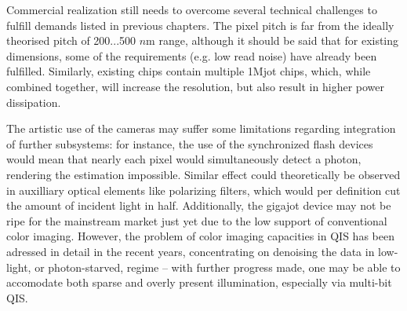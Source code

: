 
Commercial realization still needs to overcome several technical challenges to fulfill demands listed in previous chapters. The pixel pitch is far from the ideally theorised pitch of 200...500 $n$m range, although it should be said that for existing dimensions, some of the requirements (e.g. low read noise) have already been fulfilled. Similarly, existing chips contain multiple 1Mjot chips, which, while combined together, will increase the resolution, but  also result in higher power dissipation.

The artistic use of the cameras may suffer some limitations regarding integration of further subsystems: for instance, the use of the synchronized flash devices would mean that nearly each pixel would simultaneously detect a photon, rendering the estimation impossible. Similar effect could theoretically be observed in auxilliary optical elements like polarizing filters, which would per definition cut the amount of incident light in half. Additionally, the gigajot device may not be ripe for the mainstream market just yet due to the low support of conventional color imaging. However, the problem of color imaging capacities in QIS has been adressed in detail in the recent years, concentrating on denoising the data in low-light, or photon-starved, regime\cite{elgendy2019color, gnanasambandam2020image} -- with further progress made, one may be able to accomodate both sparse and overly present illumination, especially via multi-bit QIS. 

